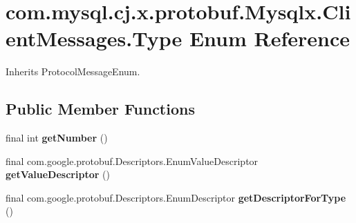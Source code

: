 \hypertarget{enumcom_1_1mysql_1_1cj_1_1x_1_1protobuf_1_1_mysqlx_1_1_client_messages_1_1_type}{}\section{com.\+mysql.\+cj.\+x.\+protobuf.\+Mysqlx.\+Client\+Messages.\+Type Enum Reference}
\label{enumcom_1_1mysql_1_1cj_1_1x_1_1protobuf_1_1_mysqlx_1_1_client_messages_1_1_type}


Inherits Protocol\+Message\+Enum.

\subsection*{Public Member Functions}
\begin{DoxyCompactItemize}
\item 
\mbox{\label{enumcom_1_1mysql_1_1cj_1_1x_1_1protobuf_1_1_mysqlx_1_1_client_messages_1_1_type_a0d2e8aad8efc94bc3acea25506efd5de}} 
final int {\bfseries get\+Number} ()
\item 
\mbox{\label{enumcom_1_1mysql_1_1cj_1_1x_1_1protobuf_1_1_mysqlx_1_1_client_messages_1_1_type_ac01aba2f05b45d2d815a17775c289b0c}} 
final com.\+google.\+protobuf.\+Descriptors.\+Enum\+Value\+Descriptor {\bfseries get\+Value\+Descriptor} ()
\item 
\mbox{\label{enumcom_1_1mysql_1_1cj_1_1x_1_1protobuf_1_1_mysqlx_1_1_client_messages_1_1_type_ae71c49568c6960276ede48b146d4be30}} 
final com.\+google.\+protobuf.\+Descriptors.\+Enum\+Descriptor {\bfseries get\+Descriptor\+For\+Type} ()
\end{DoxyCompactItemize}
